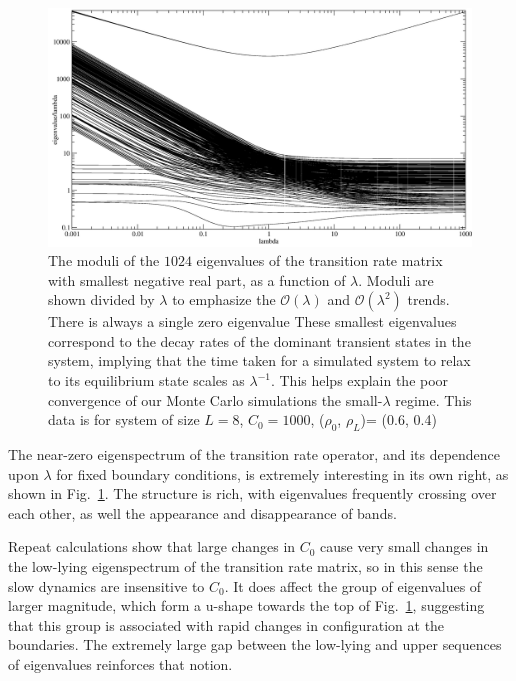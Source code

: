 \documentclass[
reprint, amsmath,amssymb, aps,
 pre, longbibliography,
]{revtex4-1}
\begin{document}
\begin{figure}[h!]
\vspace{0em}
\begin{center}
    \includegraphics[width=1\linewidth]{bigAccSpectrum}
\end{center}
    \vspace{-0em}
\caption{\label{fig:eigenspec} The moduli of the $1024$ eigenvalues of
  the transition rate matrix with smallest negative real part, as a
  function of $\lambda$.
  Moduli are shown divided by $\lambda$ to emphasize the 
  $\mathcal{O}(\lambda)$ and  $\mathcal{O}(\lambda^2)$  trends.
  There is always a single zero eigenvalue These smallest eigenvalues
  correspond to the decay rates of the dominant transient states in
  the system, implying that the time taken for a simulated system to
  relax to its equilibrium state scales as $\lambda^{-1}$. This helps
  explain the poor convergence of our Monte Carlo simulations the
  small-$\lambda$ regime.
  This data is for system of size $L=8$, $C_0=1000$, ($\rho_0$, $\rho_L$)= (0.6, 0.4)
}
\end{figure}

The near-zero eigenspectrum of the transition rate operator, and its
dependence upon $\lambda$ for fixed boundary conditions, is extremely
interesting in its own right, as shown in Fig.~\ref{fig:eigenspec}.
The structure is rich, with eigenvalues frequently crossing over each
other, as well the appearance and disappearance of bands.

Repeat calculations show that large changes in $C_0$ cause very small
changes in the low-lying eigenspectrum of the transition rate matrix,
so in this sense the slow dynamics are insensitive to $C_0$. It does
affect the group of eigenvalues of larger magnitude,
which form a u-shape towards the top of Fig.~\ref{fig:eigenspec},
suggesting that this group is associated with rapid changes in
configuration at the boundaries. The
extremely large gap between the low-lying and upper sequences of
eigenvalues reinforces that notion.  
\end{document}
